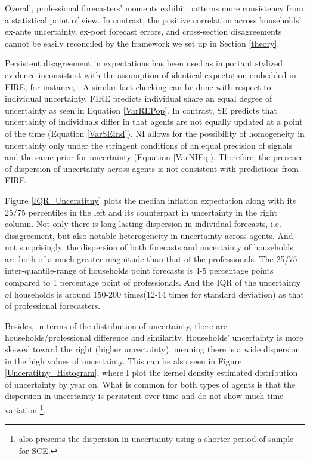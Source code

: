\documentclass[12pt]{article}
\begin{document}
	Overall, professional forecasters' moments exhibit patterns more consistency from a statistical point of view.  In contrast, the positive correlation across households' ex-ante uncertainty, ex-post forecast errors, and cross-section disagreements cannot be easily reconciled by the framework we set up in Section \ref{theory}. 
	
	Persistent disagreement in expectations has been used as important stylized evidence inconsistent with the assumption of identical expectation embedded in FIRE, for instance, \citet{mankiw2003disagreement}. A similar fact-checking can be done with respect to individual uncertainty. FIRE predicts individual share an equal degree of uncertainty as  seen in Equation \ref{VarREPop}. In contrast, SE predicts that uncertainty of individuals differ in that agents are not equally updated at a point of the time (Equation \ref{VarSEInd}). NI allows for the possibility of homogeneity in uncertainty only under the stringent conditions of an equal precision of signals and the same prior for uncertainty (Equation \ref{VarNIEq}). Therefore, the presence of dispersion of uncertainty across agents is not consistent with predictions from FIRE.
	
	Figure \ref{IQR_Unceratitny} plots the median inflation expectation along with its 25/75 percentiles in the left and its counterpart in uncertainty in the right column.  Not only there is long-lasting dispersion in individual forecasts, i.e. disagreement, but also notable heterogeneity in uncertainty across agents.  And not surprisingly, the dispersion of both forecasts and uncertainty of households are both of a much greater magnitude than that of the professionals. The 25/75 inter-quantile-range of households point forecasts is 4-5 percentage points compared to 1 percentage point of professionals. And the IQR of the uncertainty of households is around 150-200 times(12-14 times for standard deviation) as that of professional forecasters.  
	
	
	Besides, in terms of the distribution of uncertainty, there are households/professional difference and similarity. Households' uncertainty is more skewed toward the right (higher uncertainty), meaning there is a wide dispersion in the high values of uncertainty. This can be also seen in Figure \ref{Unceratitny_Histogram}, where I plot the kernel density estimated distribution of uncertainty by year on. What is common for both types of agents is that the dispersion in uncertainty is persistent over time and do not show much time-variation \footnote{\citet{kumar2015inflation} also presents the dispersion in uncertainty using a shorter-period of sample for SCE.}.  
	
\end{document}
